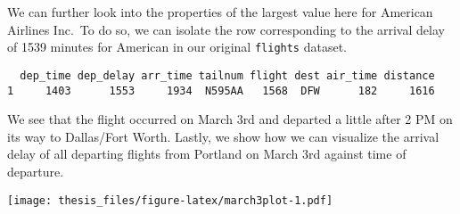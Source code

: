We can further look into the properties of the largest value here for American Airlines Inc.~To do so, we can isolate the row corresponding to the arrival delay of 1539 minutes for American in our original \texttt{flights} dataset.
\begin{Shaded}
\begin{Highlighting}[]
\SpecialCharTok{\%\textgreater{}\%}
  \NormalTok{(}
\SpecialCharTok{==} \NormalTok{,}
\SpecialCharTok{==} 
\NormalTok{  ) }\SpecialCharTok{\%\textgreater{}\%}
  \NormalTok{(}\SpecialCharTok{{-}}\NormalTok{(}
\NormalTok{  ))}
\end{Highlighting}
\end{Shaded}
\begin{verbatim}
  dep_time dep_delay arr_time tailnum flight dest air_time distance
1     1403      1553     1934  N595AA   1568  DFW      182     1616
\end{verbatim}
We see that the flight occurred on March 3rd and departed a little after 2 PM on its way to Dallas/Fort Worth. Lastly, we show how we can visualize the arrival delay of all departing flights from Portland on March 3rd against time of departure.
\begin{Shaded}
\begin{Highlighting}[]
\SpecialCharTok{\%\textgreater{}\%}
  \SpecialCharTok{==} \SpecialCharTok{==} \NormalTok{) }\SpecialCharTok{\%\textgreater{}\%}
  \NormalTok{(}\NormalTok{(}\SpecialCharTok{+}
  \NormalTok{()}
\end{Highlighting}
\end{Shaded}
\texttt{[image: thesis\_files/figure-latex/march3plot-1.pdf]}

